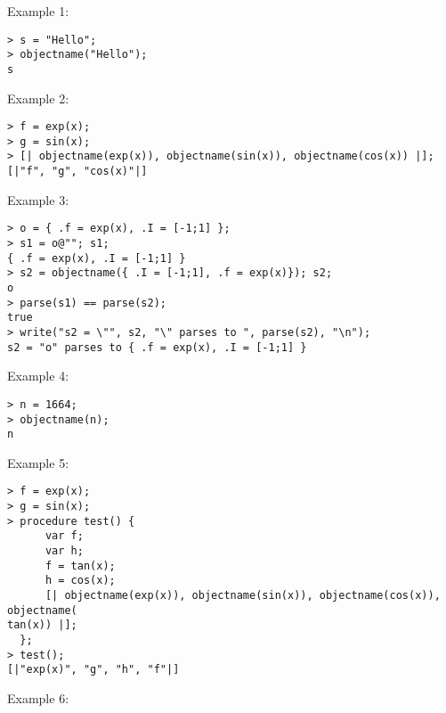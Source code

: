 \noindent Example 1: 
\begin{center}\begin{minipage}{15cm}\begin{Verbatim}[frame=single]
> s = "Hello";
> objectname("Hello");
s
\end{Verbatim}
\end{minipage}\end{center}
\noindent Example 2: 
\begin{center}\begin{minipage}{15cm}\begin{Verbatim}[frame=single]
> f = exp(x);
> g = sin(x);
> [| objectname(exp(x)), objectname(sin(x)), objectname(cos(x)) |];
[|"f", "g", "cos(x)"|]
\end{Verbatim}
\end{minipage}\end{center}
\noindent Example 3: 
\begin{center}\begin{minipage}{15cm}\begin{Verbatim}[frame=single]
> o = { .f = exp(x), .I = [-1;1] };
> s1 = o@""; s1;
{ .f = exp(x), .I = [-1;1] }
> s2 = objectname({ .I = [-1;1], .f = exp(x)}); s2;
o
> parse(s1) == parse(s2);
true
> write("s2 = \"", s2, "\" parses to ", parse(s2), "\n");
s2 = "o" parses to { .f = exp(x), .I = [-1;1] }
\end{Verbatim}
\end{minipage}\end{center}
\noindent Example 4: 
\begin{center}\begin{minipage}{15cm}\begin{Verbatim}[frame=single]
> n = 1664;
> objectname(n);
n
\end{Verbatim}
\end{minipage}\end{center}
\noindent Example 5: 
\begin{center}\begin{minipage}{15cm}\begin{Verbatim}[frame=single]
> f = exp(x);
> g = sin(x);
> procedure test() {
      var f;
      var h;
      f = tan(x);
      h = cos(x);
      [| objectname(exp(x)), objectname(sin(x)), objectname(cos(x)), objectname(
tan(x)) |];
  };
> test();
[|"exp(x)", "g", "h", "f"|]
\end{Verbatim}
\end{minipage}\end{center}
\noindent Example 6: 
